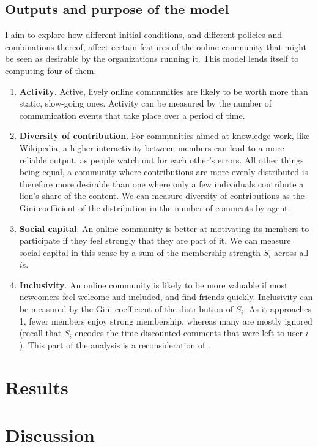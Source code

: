 \documentclass{article}
\begin{document}
\subsection{Outputs and purpose of the model}\label{section:outputs}

I aim to explore how different initial conditions, and different policies and combinations thereof, affect certain features of the online community that might be seen as desirable by the organizations running it. This model lends itself to computing four of them. 

\begin{enumerate}
\item \textbf{Activity}. Active, lively online communities are likely to be worth more than static, slow-going ones. Activity can be measured by the number of communication events that take place over a period of time.
\item \textbf{Diversity of contribution}. For communities aimed at knowledge work, like Wikipedia, a higher interactivity between members can lead to a more reliable output, as people watch out for each other's errors. All other things being equal, a community where contributions are more evenly distributed is therefore more desirable than one where only a few individuals contribute a lion's share of the content. We can measure diversity of contributions as the Gini coefficient of the distribution in the number of comments by agent.
\item \textbf{Social capital}. An online community is better at motivating its members to participate if they feel strongly that they are part of it. We can measure social capital in this sense by a sum of the membership strength $S_i$ across all $i$s.
\item \textbf{Inclusivity}. An online community is likely to be more valuable if most newcomers feel welcome and included, and find friends quickly. Inclusivity can be measured by the Gini coefficient of the distribution of $S_i$. As it approaches 1, fewer members enjoy strong membership, whereas many are mostly ignored (recall that $S_i$ encodes the time-discounted comments that were left to user $i$). This part of the analysis is a reconsideration of \cite{kim2015group}. 
\end{enumerate}

\section{Results}\label{sec_results}

\section{Discussion}\label{sec_discussion}


	
	
\end{document}
